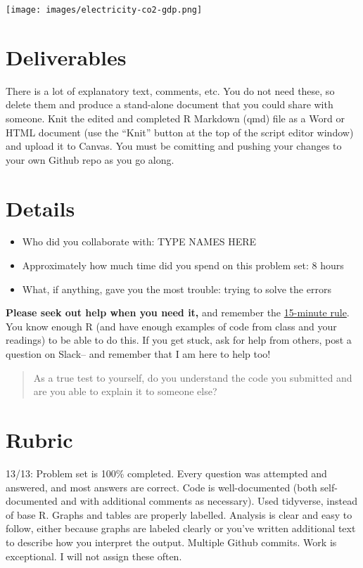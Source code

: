 \documentclass[
]{article}
\providecommand{\tightlist}{%
  \setlength{\itemsep}{0pt}\setlength{\parskip}{0pt}}
\begin{document}
\texttt{[image: images/electricity-co2-gdp.png]}

\hypertarget{deliverables}{%
\section{Deliverables}\label{deliverables}}

There is a lot of explanatory text, comments, etc. You do not need
these, so delete them and produce a stand-alone document that you could
share with someone. Knit the edited and completed R Markdown (qmd) file
as a Word or HTML document (use the ``Knit'' button at the top of the
script editor window) and upload it to Canvas. You must be comitting and
pushing your changes to your own Github repo as you go along.

\hypertarget{details}{%
\section{Details}\label{details}}

\begin{itemize}
\tightlist
\item
  Who did you collaborate with: TYPE NAMES HERE
\item
  Approximately how much time did you spend on this problem set: 8 hours
\item
  What, if anything, gave you the most trouble: trying to solve the
  errors
\end{itemize}

\textbf{Please seek out help when you need it,} and remember the
\href{https://dsb2023.netlify.app/syllabus/\#the-15-minute-rule}{15-minute
rule}. You know enough R (and have enough examples of code from class
and your readings) to be able to do this. If you get stuck, ask for help
from others, post a question on Slack-- and remember that I am here to
help too!

\begin{quote}
As a true test to yourself, do you understand the code you submitted and
are you able to explain it to someone else?
\end{quote}

\hypertarget{rubric}{%
\section{Rubric}\label{rubric}}

13/13: Problem set is 100\% completed. Every question was attempted and
answered, and most answers are correct. Code is well-documented (both
self-documented and with additional comments as necessary). Used
tidyverse, instead of base R. Graphs and tables are properly labelled.
Analysis is clear and easy to follow, either because graphs are labeled
clearly or you've written additional text to describe how you interpret
the output. Multiple Github commits. Work is exceptional. I will not
assign these often.
\end{document}
